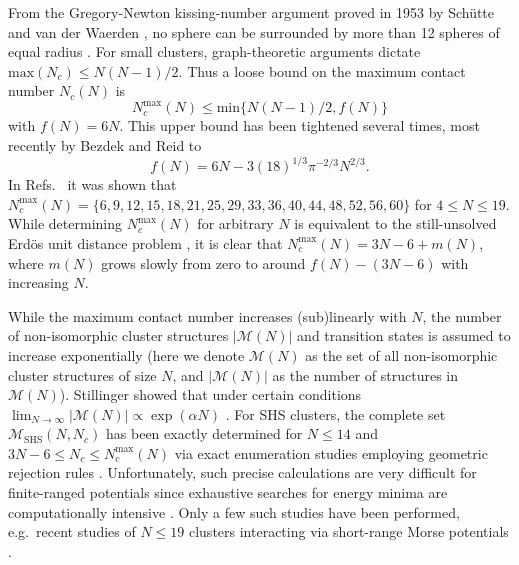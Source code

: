 From the Gregory-Newton kissing-number argument proved in 1953 by Sch\"utte and
van der Waerden \autocite{Schutte_ProblemdreizehnKugeln_1952}, no sphere can be
surrounded by more than 12 spheres of equal radius \autocite{conway-2013book}.  For
small clusters, graph-theoretic arguments dictate $\mathrm{max}(N_c)\le
N(N-1)/2$.  Thus a loose bound on the maximum contact number $N_c(N)$ is
\begin{equation}
    N_c^\mathrm{max}(N) \le \mathrm{min}\{N(N-1)/2,f(N)\}
    \label{eqn:upperlimitNc}
\end{equation}
with $f(N)=6N$.  This upper bound has been tightened several times, most
recently by Bezdek and Reid \autocite{Bezdek-2013} to
\begin{equation}
    f(N)=6N-3(18)^{1/3}\pi^{-2/3}N^{2/3}.
    \label{eqn:upperlimitBR}
\end{equation}
In
Refs.~\autocite{Hoy_Structuredynamicsmodel_2015,Holmes-Cerfon_EnumeratingRigidSphere_2016}
it was shown that $N_c^\mathrm{max}(N) =
\{6,9,12,15,18,21,25,29,33,36,40,44,48,52,56,60\}$ for $4 \leq N \leq 19$.
While determining $N_c^\mathrm{max}(N)$ for arbitrary $N$ is equivalent to the
still-unsolved Erd\"os unit distance problem \autocite{Erdos-1946}, it is clear
that $N_c^\mathrm{max}(N) = 3N - 6 + m(N)$, where $m(N)$ grows slowly from zero
to around $f(N) - (3N-6)$ with increasing $N$.

While the maximum contact number increases (sub)linearly with $N$, the number of non-isomorphic cluster structures $|\mathcal{M}(N)|$ and 
transition states is assumed to increase exponentially \autocite{Stillinger_Exponentialmultiplicityinherent_1999,Oganov-2006,Forman_ModelingAggregationProcesses_2017} (here we denote $\mathcal{M}(N)$ as the set of all non-isomorphic cluster structures of size $N$, and 
$|\mathcal{M}(N)|$ as the number of structures in $\mathcal{M}(N)$).
Stillinger showed that under certain conditions $\lim_{N\to\infty} |\mathcal{M}(N)| \propto \exp(\alpha N)$ \autocite{Stillinger_Exponentialmultiplicityinherent_1999}.
For SHS clusters, the complete set $\mathcal{M}_\mathrm{SHS}(N,N_c)$ has been exactly
determined for $N \leq 14$ and $3N - 6 \leq N_c \leq N_c^\mathrm{max}(N)$ via exact
enumeration studies employing geometric rejection rules \autocite{Hoy_Structuredynamicsmodel_2015,Holmes-Cerfon_EnumeratingRigidSphere_2016}.
Unfortunately, such precise calculations are very difficult for finite-ranged
potentials since exhaustive searches for energy minima 
are computationally intensive \autocite{Heiles_Globaloptimizationclusters_2013}.  
Only a few such studies have been performed, e.g.\ recent studies of $N \leq 19$ clusters interacting via short-range Morse
potentials \autocite{wales10,calvo12,C7CP03346J}.

